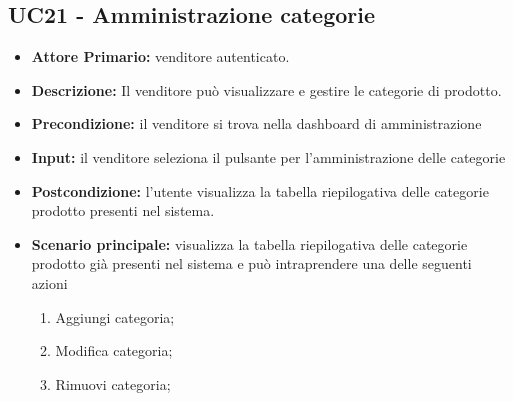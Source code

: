 \subsection{UC21 - Amministrazione categorie}
\label{UC21}
\begin{itemize}
    \item \textbf{Attore Primario:}  venditore autenticato.
    \item \textbf{Descrizione:}  Il venditore può visualizzare e gestire le categorie di prodotto.
    \item \textbf{Precondizione:}  il venditore si trova nella dashboard di amministrazione
    \item \textbf{Input:} il venditore seleziona il pulsante per l'amministrazione delle categorie
    \item \textbf{Postcondizione:} l’utente visualizza la tabella riepilogativa delle categorie prodotto presenti nel sistema.
    \item \textbf{Scenario principale:} visualizza la tabella riepilogativa delle categorie prodotto già presenti nel sistema e può intraprendere una delle seguenti azioni
    \begin{enumerate}
        \item Aggiungi categoria;
        \item Modifica categoria;
        \item Rimuovi categoria;
    \end{enumerate}
\end{itemize}

